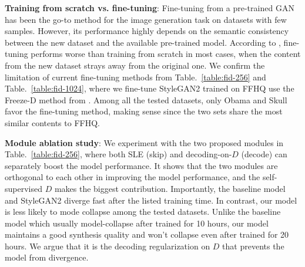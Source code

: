 \documentclass{article} \usepackage{iclr2021_conference,times}
\begin{document}
\textbf{Training from scratch vs. fine-tuning}: Fine-tuning from a pre-trained GAN \citep{mo2020freeze,noguchi2019image,wang2020minegan} has been the go-to method for the image generation task on datasets with few samples. However, its performance highly depends on the semantic consistency between the new dataset and the available pre-trained model. According to \citeauthor{zhao2020differentiable}, fine-tuning performs worse than training from scratch in most cases, when the content from the new dataset strays away from the original one. We confirm the limitation of current fine-tuning methods from Table.~\ref{table:fid-256} and Table.~\ref{table:fid-1024}, where we fine-tune StyleGAN2 trained on FFHQ use the Freeze-D method from \citeauthor{mo2020freeze}. Among all the tested datasets, only Obama and Skull favor the fine-tuning method, making sense since the two sets share the most similar contents to FFHQ.

\textbf{Module ablation study}: We experiment with the two proposed modules in Table.~\ref{table:fid-256}, where both SLE (skip) and decoding-on-$D$ (decode) can separately boost the model performance. It shows that the two modules are orthogonal to each other in improving the model performance, and the self-supervised $D$ makes the biggest contribution. Importantly, the baseline model and StyleGAN2 diverge fast after the listed training time. In contrast, our model is less likely to mode collapse among the tested datasets. Unlike the baseline model which usually model-collapse after trained for 10 hours, our model maintains a good synthesis quality and won't collapse even after trained for 20 hours. We argue that it is the decoding regularization on $ D $ that prevents the model from divergence.
\end{document}
